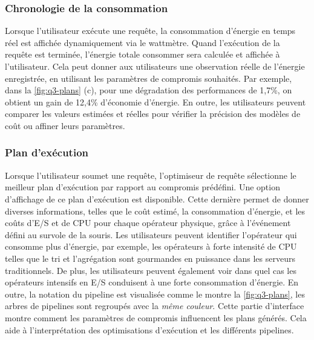 \subsubsection{Chronologie de la consommation}\label{subsec:PowerTemps-line}
Lorsque l'utilisateur exécute une requête, la consommation d’énergie en temps réel est affichée dynamiquement via le wattmètre. Quand l’exécution de la requête est terminée, l’énergie totale consommer sera calculée et affichée à l’utilisateur. Cela peut donner aux utilisateurs une observation réelle de l'énergie enregistrée, en utilisant les paramètres de compromis souhaités. Par exemple, dans la \ref{fig:q3-plans} (c), pour une dégradation des performances de 1,7\%, on obtient un gain de 12,4\% d'économie d'énergie. En outre, les utilisateurs peuvent comparer les valeurs estimées et réelles pour vérifier la précision des modèles de coût ou affiner leurs paramètres.

\subsubsection{Plan d'exécution}\label{subsec:ExecutionPlan}
Lorsque l'utilisateur soumet une requête, l'optimiseur de requête sélectionne le meilleur plan d'exécution par rapport au compromis prédéfini. Une option d’affichage de ce plan d’exécution est disponible. Cette dernière permet de donner diverses informations, telles que le coût estimé, la consommation d'énergie, et les coûts d'E/S et de CPU pour chaque opérateur physique, grâce à l'événement défini au survole de la souris. Les utilisateurs peuvent identifier l'opérateur qui consomme plus d'énergie, par exemple, les opérateurs à forte intensité de CPU telles que le tri et l'agrégation sont gourmandes en puissance dans les serveurs traditionnels. De plus, les utilisateurs peuvent également voir dans quel cas les opérateurs intensifs en E/S conduisent à une forte consommation d'énergie. En outre, la notation du pipeline est visualisée comme le montre la \ref{fig:q3-plans}, les arbres de pipelines sont regroupés avec la \textit{même couleur}. Cette partie d'interface montre comment les paramètres de compromis influencent les plans générés. Cela aide à l'interprétation des optimisations d'exécution et les différents pipelines.

